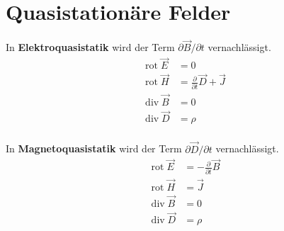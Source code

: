\documentclass[nochapterpage,bigchapter,linedtoc,longdoc,colorback,accentcolor=tud2c]{tudreport}
\DeclareMathOperator{\Div}{\mathrm{div}}
\DeclareMathOperator{\Rot}{\mathrm{rot }}
\begin{document}
\section{Quasistationäre Felder}
\begin{minipage}[t]{0.4\linewidth}
	In \textbf{Elektroquasistatik} wird der Term $\partial \vec{{B}}/ \partial t$ vernachlässigt.
	\begin{equation*}
		\begin{aligned}
			\Rot\vec{E} &=0 \\
			\Rot \vec{H} &= \frac{\partial}{\partial t}\vec{D} + \vec{J} \\
			\Div \vec{B} &=0 \\
			\Div \vec{D} &= \rho \\
		\end{aligned}
	\end{equation*}
\end{minipage}
\hfill {\vrule width 1pt} \hfill %
\begin{minipage}[t]{0.4\linewidth}
	In \textbf{Magnetoquasistatik} wird der Term $\partial \vec{D} / \partial t$ vernachlässigt.
	\begin{equation*}
		\begin{aligned}
			\Rot \vec{E} &= -\frac{\partial}{\partial t} \vec{B}\\
			\Rot \vec{H} &= \vec{J}\\
			\Div \vec{B} &= 0 \\
			\Div \vec{D} &= \rho \\
		\end{aligned}
	\end{equation*}
\end{minipage}
\end{document}
